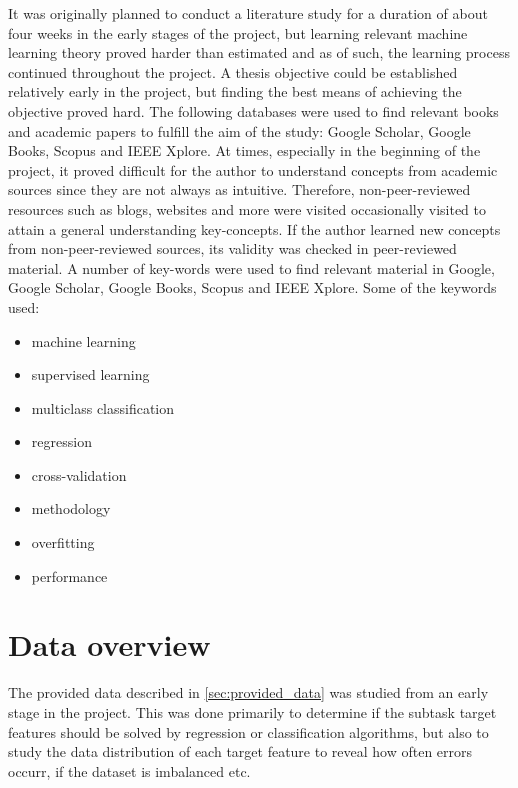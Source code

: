 	It was originally planned to conduct a literature study for a duration of about four weeks in the early stages of the project, but learning relevant machine learning theory proved harder than estimated and as of such, the learning process continued throughout the project. A thesis objective could be established relatively early in the project, but finding the best means of achieving the objective proved hard. The following databases were used to find relevant books and academic papers to fulfill the aim of the study: Google Scholar, Google Books, Scopus and IEEE Xplore. At times, especially in the beginning of the project, it proved difficult for the author to understand concepts from academic sources since they are not always as intuitive. Therefore, non-peer-reviewed resources such as blogs, websites and more were visited occasionally visited to attain a general understanding key-concepts. If the author learned new concepts from non-peer-reviewed sources, its validity was checked in peer-reviewed material. A number of key-words were used to find relevant material in Google, Google Scholar, Google Books, Scopus and IEEE Xplore. Some of the keywords used:

	\begin{itemize}
		\item machine learning
		\item supervised learning
		\item multiclass classification
		\item regression
		\item cross-validation
		\item methodology
		\item overfitting
		\item performance
	\end{itemize}

	
\section{Data overview}
	The provided data described in \ref{sec:provided_data} was studied from an early stage in the project. This was done primarily to determine if the subtask target features should be solved by regression or classification algorithms, but also to study the data distribution of each target feature to reveal how often errors occurr, if the dataset is imbalanced etc. 


